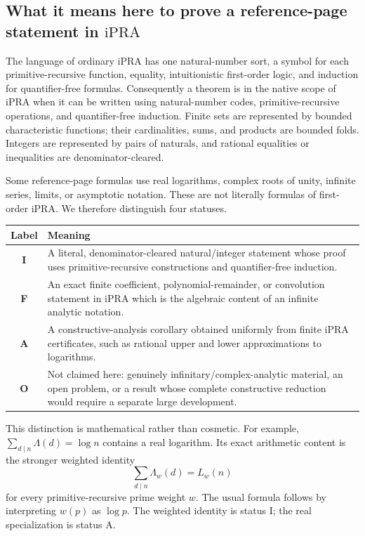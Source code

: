 \documentclass[11pt]{article}
\theoremstyle{definition}
\newcommand{\ipra}{\mathrm{iPRA}}
\newcommand{\StatusI}{\textsf{I}}
\newcommand{\StatusF}{\textsf{F}}
\newcommand{\StatusA}{\textsf{A}}
\newcommand{\StatusO}{\textsf{O}}
\begin{document}
\subsection{What it means here to prove a reference-page statement in \(\ipra\)}

The language of ordinary \(\ipra\) has one natural-number sort, a symbol for
each primitive-recursive function, equality, intuitionistic first-order logic,
and induction for quantifier-free formulas.  Consequently a theorem is in the
native scope of \(\ipra\) when it can be written using natural-number codes,
primitive-recursive operations, and quantifier-free induction.  Finite sets
are represented by bounded characteristic functions; their cardinalities,
sums, and products are bounded folds.  Integers are represented by pairs of
naturals, and rational equalities or inequalities are denominator-cleared.

Some reference-page formulas use real logarithms, complex roots of unity,
infinite series, limits, or asymptotic notation.  These are not literally
formulas of first-order \(\ipra\).  We therefore distinguish four statuses.

\begin{center}
\begin{tabularx}{0.94\textwidth}{>{\bfseries}c X}
\toprule
Label & Meaning \\
\midrule
\StatusI & A literal, denominator-cleared natural/integer statement whose proof uses primitive-recursive constructions and quantifier-free induction. \\
\StatusF & An exact finite coefficient, polynomial-remainder, or convolution statement in \(\ipra\) which is the algebraic content of an infinite analytic notation. \\
\StatusA & A constructive-analysis corollary obtained uniformly from finite \(\ipra\) certificates, such as rational upper and lower approximations to logarithms. \\
\StatusO & Not claimed here: genuinely infinitary/complex-analytic material, an open problem, or a result whose complete constructive reduction would require a separate large development. \\
\bottomrule
\end{tabularx}
\end{center}

This distinction is mathematical rather than cosmetic.  For example,
\(\sum_{d\mid n}\Lambda(d)=\log n\) contains a real logarithm.  Its exact
arithmetic content is the stronger weighted identity
\[
 \sum_{d\mid n}\Lambda_w(d)=L_w(n)
\]
for every primitive-recursive prime weight \(w\).  The usual formula follows
by interpreting \(w(p)\) as \(\log p\).  The weighted identity is status
\StatusI; the real specialization is status \StatusA.
\end{document}
